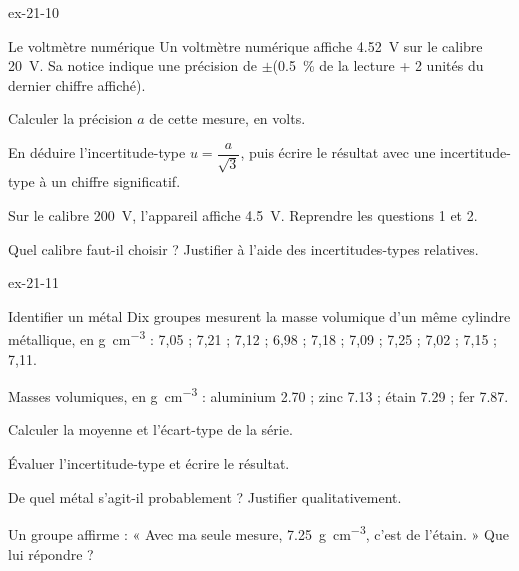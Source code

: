 \begin{blocLivre}{ex-21-10}
\begin{exercice}[2]{Le voltmètre numérique}
Un voltmètre numérique affiche \qty{4,52}{V} sur le calibre \qty{20}{V}. Sa notice indique une précision de $\pm$(\qty{0,5}{\percent} de la lecture
+ 2 unités du dernier chiffre affiché).
\begin{questions}
\item Calculer la précision $a$ de cette mesure, en volts.
\item En déduire l'incertitude-type $u=\dfrac{a}{\sqrt{3}}$, puis écrire le résultat avec une incertitude-type à un chiffre significatif.
\item Sur le calibre \qty{200}{V}, l'appareil affiche \qty{4,5}{V}. Reprendre les questions 1 et 2.
\item Quel calibre faut-il choisir ? Justifier à l'aide des incertitudes-types relatives.
\end{questions}
\end{exercice}
\end{blocLivre}
\begin{blocLivre}{ex-21-11}
\begin{exercice}[2]{Identifier un métal}
Dix groupes mesurent la masse volumique d'un même cylindre métallique, en \unit{g.cm^{-3}} : 7,05 ; 7,21 ; 7,12 ; 6,98 ; 7,18 ; 7,09 ; 7,25 ; 7,02 ;
7,15 ; 7,11.
\begin{donnees}
Masses volumiques, en \unit{g.cm^{-3}} : aluminium \num{2,70} ; zinc \num{7,13} ; étain \num{7,29} ; fer \num{7,87}.
\end{donnees}
\begin{questions}
\item Calculer la moyenne et l'écart-type de la série.
\item Évaluer l'incertitude-type et écrire le résultat.
\item De quel métal s'agit-il probablement ? Justifier qualitativement.
\item Un groupe affirme : « Avec ma seule mesure, \qty{7,25}{g.cm^{-3}}, c'est de l'étain. » Que lui répondre ?
\end{questions}
\end{exercice}
\end{blocLivre}
